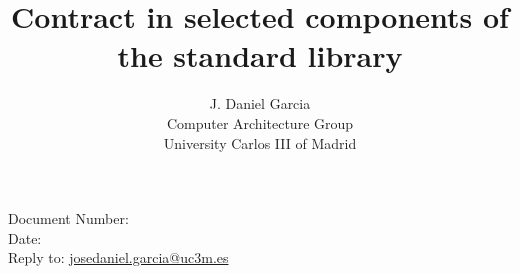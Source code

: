 \documentclass[10pt,a4paper,oneside,final,notitlepage]{article}%
\begin{document}


\begin{flushright}
Document Number: \texttt{\paperid}\\
Date: \paperdate\\
Reply to: \url{josedaniel.garcia@uc3m.es}
\end{flushright}

\title{Contract in selected components of the standard library}
\author{J. Daniel Garcia\\
Computer Architecture Group\\
University Carlos III of Madrid\\
}
\date{}

\begingroup
\let\newpage\relax%
\maketitle
\endgroup




%
%
\end{document}
